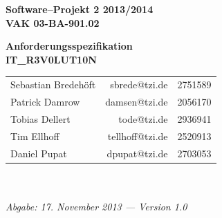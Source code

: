 \documentclass[fontsize=12pt,paper=a4,twoside]{scrartcl}
\begin{document}
  \thispagestyle{fancy}
  \fancyhead[LO,RE]{ }
  \fancyfoot[C]{}

  \vspace{3cm}

  \begin{minipage}[H]{\textwidth}
  \begin{center}
  \bf
  \Large
  Software--Projekt 2 2013/2014\\
  \smallskip
  \small
  VAK 03-BA-901.02\\
  \vspace{3cm}
  \end{center}
  \end{minipage}
  \begin{minipage}[H]{\textwidth}
  \begin{center}
  \vspace{1cm}
  \bf
  \Large Anforderungsspezifikation\\ 
  \vspace{3ex}
  \small IT\_R3V0LUT10N\\
  \vfill
  \end{center}
  \end{minipage}
  \vfill
  \begin{minipage}[H]{\textwidth}
  \begin{center}
  \sf
  \begin{tabular}{lrr}
  Sebastian Bredehöft & sbrede@tzi.de & 2751589\\
  Patrick Damrow & damsen@tzi.de & 2056170\\
  Tobias Dellert & tode@tzi.de & 2936941\\
  Tim Ellhoff & tellhoff@tzi.de & 2520913\\
  Daniel Pupat & dpupat@tzi.de & 2703053\\
  
  \end{tabular}
  \\ ~
  \vspace{2cm}
  \\
  \it Abgabe: 17. November 2013 --- Version 1.0\\ ~
  \end{center}
  \end{minipage}
\end{document}
